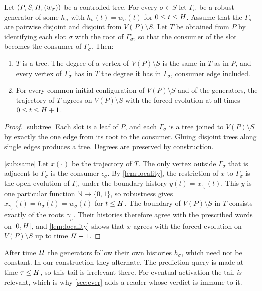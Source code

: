 \begin{proposition}\label{prop:substitution}
Let $(P,S,H,(w_\sigma))$ be a controlled tree. For every $\sigma\in S$ let $\Gamma_\sigma$ be a
robust generator of some $h_\sigma$ with $h_\sigma(t)=w_\sigma(t)$ for $0\le t\le H$. Assume that the
$\Gamma_\sigma$ are pairwise disjoint and disjoint from $V(P)\setminus S$. Let $T$ be obtained from
$P$ by identifying each slot $\sigma$ with the root of $\Gamma_\sigma$, so that the consumer of the
slot becomes the consumer of $\Gamma_\sigma$. Then:
\begin{enumerate}[label=(\alph*)]
\item\label{sub:tree} $T$ is a tree. The degree of a vertex of $V(P)\setminus S$ is the same in
  $T$ as in $P$, and every vertex of $\Gamma_\sigma$ has in $T$ the degree it has in $\Gamma_\sigma$,
  consumer edge included.
\item\label{sub:same} For every common initial configuration of $V(P)\setminus S$ and of the
  generators, the trajectory of $T$ agrees on $V(P)\setminus S$ with the forced evolution at all
  times $0\le t\le H+1$.
\end{enumerate}
\end{proposition}

\begin{proof}
\ref{sub:tree} Each slot is a leaf of $P$, and each $\Gamma_\sigma$ is a tree joined to
$V(P)\setminus S$ by exactly the one edge from its root to the consumer. Gluing disjoint trees along
single edges produces a tree. Degrees are preserved by construction.

\ref{sub:same} Let $x(\cdot)$ be the trajectory of $T$. The only vertex outside $\Gamma_\sigma$ that
is adjacent to $\Gamma_\sigma$ is the consumer $\epsilon_\sigma$. By \cref{lem:locality}, the
restriction of $x$ to $\Gamma_\sigma$ is the open evolution of $\Gamma_\sigma$ under the boundary
history $y(t)=x_{\epsilon_\sigma}(t)$. This $y$ is one particular function
$\mathbb N\to\{0,1\}$, so robustness gives $x_{\gamma_\sigma}(t)=h_\sigma(t)=w_\sigma(t)$ for
$t\le H$. The boundary of $V(P)\setminus S$ in $T$ consists exactly of the roots
$\gamma_\sigma$. Their histories therefore agree with the prescribed words on $[0,H]$, and
\cref{lem:locality} shows that $x$ agrees with the forced evolution on $V(P)\setminus S$ up to time
$H+1$.
\end{proof}

\begin{remark}\label{rem:afterH}
After time $H$ the generators follow their own histories $h_\sigma$, which need not be constant. In
our construction they alternate. The prediction query is made at time $\tau\le H$, so this tail is
irrelevant there. For eventual activation the tail \emph{is} relevant, which is why
\cref{sec:ever} adds a reader whose verdict is immune to it.
\end{remark}

